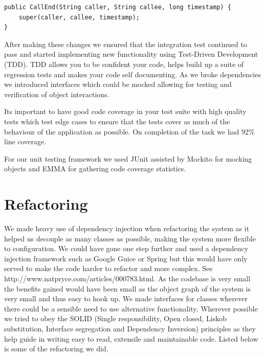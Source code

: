 \documentclass[a4paper,11pt]{article}
\begin{document}
\begin{verbatim}
public CallEnd(String caller, String callee, long timestamp) {
    super(caller, callee, timestamp);
}
\end{verbatim}

After making these changes we ensured that the integration test continued to pass and started implementing new functionality using Test-Driven Development (TDD).  TDD allows you to be confident your code, helps build up a suite of regression tests and makes your code self documenting. As we broke dependencies we introduced interfaces which could be mocked allowing for testing and verification of object interactions.

Its important to have good code coverage in your test suite with high quality tests which test edge cases to ensure that the tests cover as much of the behaviour of the application as possible. On completion of the task we had 92\% line coverage.

For our unit testing framework we used JUnit assisted by Mockito for mocking objects and EMMA for gathering code coverage statistics. 



\section{Refactoring}

We made heavy use of dependency injection when refactoring the system as it helped us decouple as many classes as possible, making the system more flexible to configuration. We could have gone one step further and used a dependency injection framework such as Google Guice or Spring but this would have only served to make the code harder to refactor and more complex. See http://www.natpryce.com/articles/000783.html. As the codebase is very small the benefits gained would have been small as the object graph of the system is very small and thus easy to hook up. We made interfaces for classes wherever there could be a sensible need to use alternative functionality. Wherever possible we tried to obey the SOLID (Single responsibility, Open closed, Liskob substitution, Interface segregation and Dependency Inversion) principles as they help guide in writing easy to read, extensile and maintainable code. Listed below is some of the refactoring we did.
\end{document}

